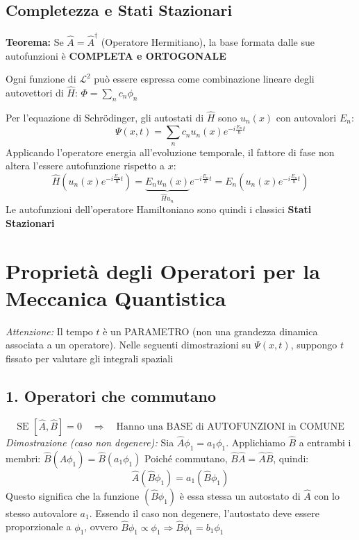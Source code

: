 \documentclass[11pt, a4paper]{article}
\begin{document}
\subsection{Completezza e Stati Stazionari} %
\textbf{Teorema:} Se $\hat{A} = \hat{A}^\dagger$ (Operatore Hermitiano), la base formata dalle sue autofunzioni è \textbf{COMPLETA e ORTOGONALE} %

\noindent
Ogni funzione di $\mathcal{L}^2$ può essere espressa come combinazione lineare degli autovettori di $\hat{H}$: $\Phi = \sum_n c_n \phi_n$ %

\noindent
Per l'equazione di Schrödinger, gli autostati di $\hat{H}$ sono $u_n(x)$ con autovalori $E_n$: %
\begin{equation*}
    \Psi(x,t) = \sum_n c_n u_n(x) e^{-i\frac{E_n}{\hbar}t} %
\end{equation*}
Applicando l'operatore energia all'evoluzione temporale, il fattore di fase non altera l'essere autofunzione rispetto a $x$: %
\begin{equation*}
    \hat{H} \left( u_n(x) e^{-i\frac{E_n}{\hbar}t} \right) = \underbrace{E_n u_n(x)}_{\hat{H}u_n} e^{-i\frac{E_n}{\hbar}t} = E_n \left( u_n(x) e^{-i\frac{E_n}{\hbar}t} \right) %
\end{equation*}
Le autofunzioni dell'operatore Hamiltoniano sono quindi i classici \textbf{Stati Stazionari} %

\section{Proprietà degli Operatori per la Meccanica Quantistica} %

\textit{Attenzione:} Il tempo $t$ è un PARAMETRO (non una grandezza dinamica associata a un operatore). Nelle seguenti dimostrazioni su $\Psi(x,t)$, suppongo $t$ fissato per valutare gli integrali spaziali \\

\noindent
\subsection{1. Operatori che commutano} %
\begin{equation}
    \text{SE } [\hat{A}, \hat{B}] = 0 \quad \Rightarrow \quad \text{Hanno una BASE di AUTOFUNZIONI in COMUNE} %
\end{equation}
\textit{Dimostrazione (caso non degenere):} %
Sia $\hat{A}\phi_1 = a_1\phi_1$. Applichiamo $\hat{B}$ a entrambi i membri: $\hat{B}(\hat{A}\phi_1) = \hat{B}(a_1\phi_1)$ %
Poiché commutano, $\hat{B}\hat{A} = \hat{A}\hat{B}$, quindi: %
\begin{equation*}
    \hat{A}(\hat{B}\phi_1) = a_1(\hat{B}\phi_1) %
\end{equation*}
Questo significa che la funzione $(\hat{B}\phi_1)$ è essa stessa un autostato di $\hat{A}$ con lo stesso autovalore $a_1$. Essendo il caso non degenere, l'autostato deve essere proporzionale a $\phi_1$, ovvero $\hat{B}\phi_1 \propto \phi_1 \Rightarrow \hat{B}\phi_1 = b_1\phi_1$ \\
\end{document}
